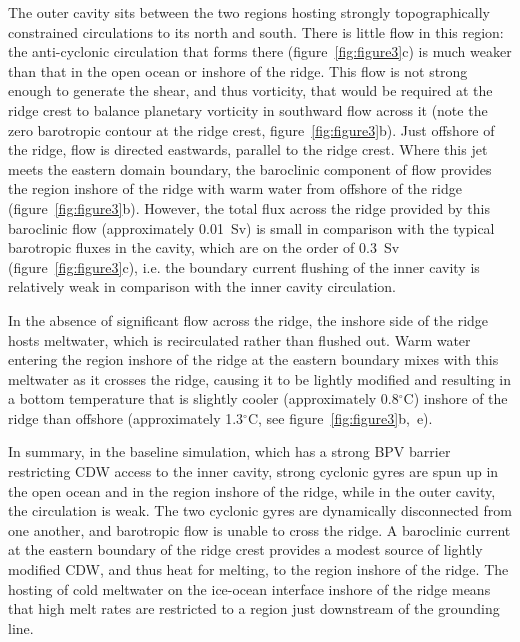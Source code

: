 \documentclass[draft]{agujournal2019}
\begin{document}
The outer cavity sits between the two regions hosting strongly topographically constrained circulations to its north and south. There is little flow in this region: the anti-cyclonic circulation that forms there (figure~\ref{fig:figure3}c) is much weaker than that in the open ocean or inshore of the ridge. This flow is not strong enough to generate the shear, and thus vorticity, that would be required at the ridge crest to balance planetary vorticity in southward flow across it (note the zero barotropic contour at the ridge crest, figure~\ref{fig:figure3}b). Just offshore of the ridge, flow is directed eastwards, parallel to the ridge crest. Where this jet meets the eastern domain boundary, the baroclinic component of flow provides the region inshore of the ridge with warm water from offshore of the ridge (figure~\ref{fig:figure3}b). However, the total flux across the ridge provided by this baroclinic flow (approximately 0.01~Sv) is small in comparison with the typical barotropic fluxes in the cavity, which are on the order of 0.3~Sv  (figure~\ref{fig:figure3}c), i.e. the boundary current flushing of the inner cavity is relatively weak in comparison with the inner cavity circulation.

In the absence of significant flow across the ridge, the inshore side of the ridge hosts meltwater, which is recirculated rather than flushed out. Warm water entering the region inshore of the ridge at the eastern boundary mixes with this meltwater as it crosses the ridge, causing it to be lightly modified and resulting in a bottom temperature that is slightly cooler (approximately 0.8${}^\circ$C) inshore of the ridge than offshore (approximately 1.3${}^\circ$C, see figure~\ref{fig:figure3}b,~e).


In summary, in the baseline simulation, which has a strong BPV barrier restricting CDW access to the inner cavity, strong cyclonic gyres are spun up in the open ocean and in the region inshore of the ridge, while in the outer cavity, the circulation is weak. The two cyclonic gyres are dynamically disconnected from one another, and barotropic flow is unable to cross the ridge. A baroclinic current at the eastern boundary of the ridge crest provides a modest source of lightly modified CDW, and thus heat for melting, to the region inshore of the ridge. The hosting of cold meltwater on the ice-ocean interface inshore of the ridge means that high melt rates are restricted to a region just downstream of the grounding line. 
\end{document}
